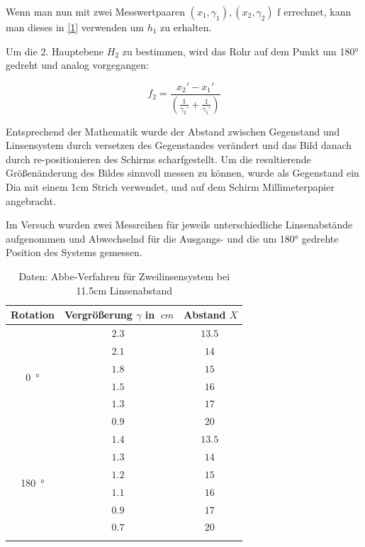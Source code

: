 Wenn man nun mit zwei Messwertpaaren $(x_1, \gamma_1), (x_2, \gamma_2)$ f errechnet, kann man dieses in \ref{1} verwenden um $h_1$ zu erhalten.

Um die 2. Hauptebene $H_2$ zu bestimmen, wird das Rohr auf dem Punkt um 180° gedreht und analog vorgegangen:

\begin{equation} \label{4}
    f_2 = \frac{x_2' - x_1'}{(\frac{1}{\gamma_2'} + \frac{1}{\gamma_1'})}
\end{equation}

Entsprechend der Mathematik wurde der Abstand zwischen Gegenstand und Linsensystem durch versetzen des Gegenstandes verändert und das Bild danach durch re-positionieren des Schirms scharfgestellt.
Um die resultierende Größenänderung des Bildes sinnvoll messen zu können, wurde als Gegenstand ein Dia mit einem 1cm Strich verwendet, und auf dem Schirm Millimeterpapier angebracht.

Im Versuch wurden zwei Messreihen für jeweils unterschiedliche Linsenabstände aufgenommen und Abwechselnd für die Ausgangs- und die um 180° gedrehte Position des Systems gemessen.

\begin{table}[h!]
    \begin{center}
        \caption{Daten: Abbe-Verfahren für Zweilinsensystem bei 11.5cm Linsenabstand}
        \begin{tabular}{ccc}
            \hline
            Rotation   &  Vergrößerung  $\gamma$ in $\SI{}{cm}$    & Abstand $X$ \\
            \hline
            \multirow{6}{*}{\SI{0}{\degree}}    & $\SI{2.3}{}$ & $\SI{13.5}{}$ \\
                                                & $\SI{2.1}{}$ & $\SI{14}{}$ \\
                                                & $\SI{1.8}{}$ & $\SI{15}{}$ \\
                                                & $\SI{1.5}{}$ & $\SI{16}{}$ \\
                                                & $\SI{1.3}{}$ & $\SI{17}{}$ \\
                                                & $\SI{0.9}{}$ & $\SI{20}{}$ \\
            \hline
            \multirow{6}{*}{\SI{180}{\degree}}  & $\SI{1.4}{}$ & $\SI{13.5}{}$ \\
                                                & $\SI{1.3}{}$ & $\SI{14}{}$ \\
                                                & $\SI{1.2}{}$ & $\SI{15}{}$ \\
                                                & $\SI{1.1}{}$ & $\SI{16}{}$ \\
                                                & $\SI{0.9}{}$ & $\SI{17}{}$ \\
                                                & $\SI{0.7}{}$ & $\SI{20}{}$ \\
            \hline
            \label{tab:Abbe1}
        \end{tabular}
    \end{center}
\end{table}

